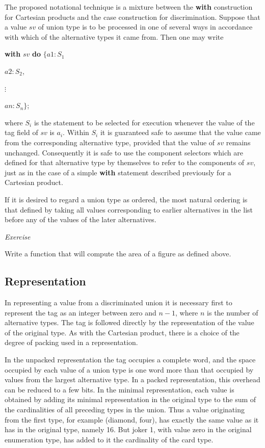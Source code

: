 \documentclass[twoside,11pt]{book}
\let\mathvdots\vdots
\renewcommand{\vdots}{\ensuremath{\mathvdots}}%
\begin{document}
The proposed notational technique is a mixture between the \textbf{with} construction for Cartesian products and the case construction for discrimination. Suppose that a value $sv$ of union type is to be processed in one of several ways in accordance with which of the alternative types it came from. Then one may write

\quad \textbf{with} $sv$ \textbf{do} $\{a1:S_1$

\tabto*{7.6em}$a2:S_2$,
\smallskip

\tabto*{8.85em}\vdots

\tabto*{7.6em}$an:S_n\}$;

\noindent
where $S_i$ is the statement to be selected for execution whenever the value of the tag field of $sv$ is $a_i$. Within $S_i$ it is guaranteed safe to assume that the value came from the corresponding alternative type, provided that the value of $sv$ remains unchanged. Consequently it is safe to use the component selectors which are defined for that alternative type by themselves to refer to the components of $sv$, just as in the case of a simple \textbf{with} statement described previously for a Cartesian product.

If it is desired to regard a union type as ordered, the most natural ordering is that defined by taking all values corresponding to earlier alternatives in the list before any of the values of the later alternatives.

\noindent
\textit{Exercise}
\nopagebreak

\noindent
Write a function that will compute the area of a figure as defined above.

\subsection{Representation}

In representing a value from a discriminated union it is necessary first to represent the tag as an integer between zero and $n - 1$, where $n$ is the number of alternative types. The tag is followed directly by the representation of the value of the original type. As with the Cartesian product, there is a choice of the degree of packing used in a representation.

In the unpacked representation the tag occupies a complete word, and the space occupied by each value of a union type is one word more than that occupied by values from the largest alternative type. In a packed representation, this overhead can be reduced to a few bits. In the minimal representation, each value is obtained by adding its minimal representation in the original type to the sum of the cardinalities of all preceding types in the union. Thus a value originating from the first type, for example (diamond, four), has exactly the same value as it has in the original type, namely 16. But joker 1, with value zero in the original enumeration type, has added to it the cardinality of the card type.
\end{document}
